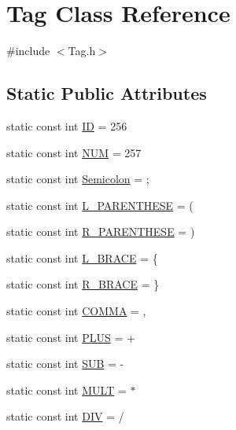 \hypertarget{class_tag}{}\section{Tag Class Reference}
\label{class_tag}


{\ttfamily \#include $<$Tag.\+h$>$}

\subsection*{Static Public Attributes}
\begin{DoxyCompactItemize}
\item 
static const int \hyperlink{class_tag_acdf9d38c11c7dff1026caea53454d62c}{ID} = 256
\item 
static const int \hyperlink{class_tag_a37bd7cc8cc362fca325f553b2844d745}{N\+UM} = 257
\item 
static const int \hyperlink{class_tag_a383b3b3d27ad94992a9345cf51632f31}{Semicolon} = \textquotesingle{};\textquotesingle{}
\item 
static const int \hyperlink{class_tag_a3f592bff8a566859e6953cd380e809e7}{L\+\_\+\+P\+A\+R\+E\+N\+T\+H\+E\+SE} = \textquotesingle{}(\textquotesingle{}
\item 
static const int \hyperlink{class_tag_a06f70b28d8eb3e9f3d2d7dcc6a318fee}{R\+\_\+\+P\+A\+R\+E\+N\+T\+H\+E\+SE} = \textquotesingle{})\textquotesingle{}
\item 
static const int \hyperlink{class_tag_a27f8b6e653f63d5a04cbf773d7aef40d}{L\+\_\+\+B\+R\+A\+CE} = \textquotesingle{}\{\textquotesingle{}
\item 
static const int \hyperlink{class_tag_ac75cf51168e5f889ec56a8e5cebc4483}{R\+\_\+\+B\+R\+A\+CE} = \textquotesingle{}\}\textquotesingle{}
\item 
static const int \hyperlink{class_tag_ad0218cdf6f9bc11b27aa07dc789e0a2c}{C\+O\+M\+MA} = \textquotesingle{},\textquotesingle{}
\item 
static const int \hyperlink{class_tag_aa94fc1145460d63eb408321dd9b2b4c6}{P\+L\+US} = \textquotesingle{}+\textquotesingle{}
\item 
static const int \hyperlink{class_tag_a74a3061b0a3125dae8759a9490298b28}{S\+UB} = \textquotesingle{}-\/\textquotesingle{}
\item 
static const int \hyperlink{class_tag_a2adc4fe55411d9f65477992a527601fe}{M\+U\+LT} = \textquotesingle{}$\ast$\textquotesingle{}
\item 
static const int \hyperlink{class_tag_a17b55c27354f38f161e670ca29e26ce0}{D\+IV} = \textquotesingle{}/\textquotesingle{}

\end{DoxyCompactItemize}
